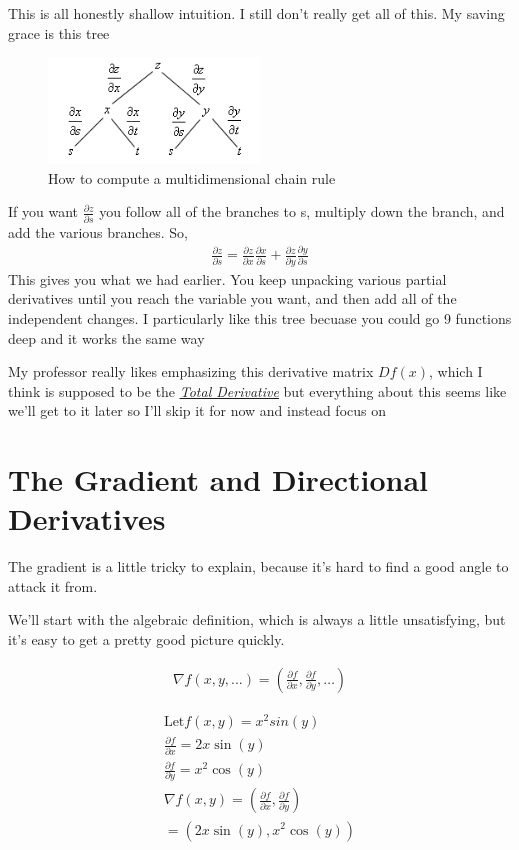 \documentclass[12pt, letterpaper]{article}
\newcommand{\externalLink}[2]{\emph{\underline{\href{#1}{#2}}}}
\begin{document}
This is all honestly shallow intuition. I still don't really get all of this. My saving grace is this tree
\begin{figure}[h]
    \centering 
    \includegraphics[width=0.5\textwidth]{chainruletree}
    \caption{How to compute a multidimensional chain rule}
\end{figure}

If you want \large$\frac{\partial z}{\partial s}$ \normalsize you follow all of the branches to s, multiply down the branch, and add the various branches. So,
\begin{gather*}
    \frac{\partial z}{\partial s} = \frac{\partial z}{\partial x} \frac{\partial x}{\partial s} + \frac{\partial z}{\partial y} \frac{\partial y}{\partial s}
\end{gather*}
This gives you what we had earlier. You keep unpacking various partial derivatives until you reach the variable you want, and then add all of the independent changes. I particularly like this tree becuase you could go 9 functions deep and it works the same way

My professor really likes emphasizing this derivative matrix $Df(x)$, which I think is supposed to be the \externalLink{https://en.wikipedia.org/wiki/Total_derivative}{Total Derivative} but everything about this seems like we'll get to it later so I'll skip it for now and instead focus on

\section{The Gradient and Directional Derivatives}
The gradient is a little tricky to explain, because it's hard to find a good angle to attack it from.

We'll start with the algebraic definition, which is always a little unsatisfying, but it's easy to get a pretty good picture quickly.

\begin{gather*}
    \nabla f(x, y, ...) = (\frac{\partial f}{\partial x}, \frac{\partial f}{\partial y}, \dots)
\end{gather*}

\begin{gather*}
    \text{Let} f(x, y) = x^2 sin(y)\\
    \frac{\partial f}{\partial x} = 2x\sin(y) \\
    \frac{\partial f}{\partial y} = x^2\cos(y) \\
    \nabla f(x, y) = (\frac{\partial f}{\partial x}, \frac{\partial f}{\partial y}) \\
    = (2x\sin(y), x^2\cos(y))
\end{gather*}
\end{document}
